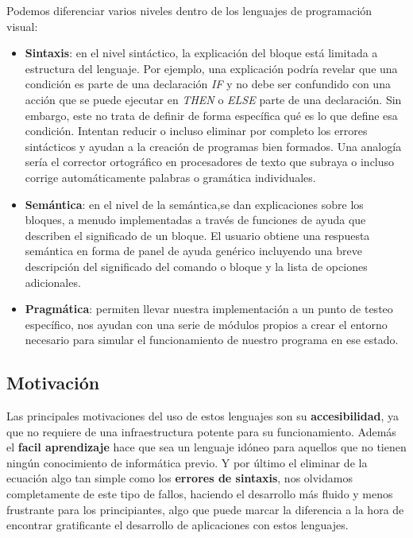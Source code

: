 Podemos diferenciar varios niveles dentro de los lenguajes de programación visual:
\begin{itemize}
\item \textbf{Sintaxis}: en el nivel sintáctico, la explicación del bloque está limitada a
estructura del lenguaje. Por ejemplo, una explicación podría revelar que una condición es parte de una declaración \textit{IF} y no debe ser confundido con una acción que se puede ejecutar en \textit{THEN} o \textit{ELSE} parte de una declaración. Sin embargo, este no trata de definir de forma específica qué es lo que define esa condición.
Intentan reducir o incluso eliminar por completo los errores sintácticos y ayudan a la creación de programas bien formados. Una analogía sería el corrector ortográfico en procesadores de texto que subraya o incluso corrige automáticamente palabras o gramática individuales.	

\item \textbf{Semántica}: en el nivel de la semántica,se dan explicaciones sobre los bloques, a menudo implementadas a través de funciones de ayuda que describen el significado
de un bloque. El usuario obtiene una respuesta semántica en forma de panel de ayuda genérico incluyendo una breve descripción del significado del comando o bloque y la lista de opciones adicionales.

\item \textbf{Pragmática}: permiten llevar nuestra implementación a un punto de testeo específico, nos ayudan con una serie de módulos propios a crear el entorno necesario para simular el funcionamiento de nuestro programa en ese estado.
\end{itemize}

\subsection{Motivación}
\label{subsec:motivacion}
Las principales motivaciones del uso de estos lenguajes son su \textbf{accesibilidad}, ya que no requiere de una infraestructura potente para su funcionamiento.
Además el \textbf{facil aprendizaje} hace que sea un lenguaje idóneo para aquellos que no tienen ningún conocimiento de informática previo.
Y por último el eliminar de la ecuación algo tan simple como los \textbf{errores de sintaxis}, nos olvidamos completamente de este tipo de fallos, haciendo el desarrollo más fluido y menos frustrante para los principiantes, algo que puede marcar la diferencia a la hora de encontrar gratificante el desarrollo de aplicaciones con estos lenguajes.

